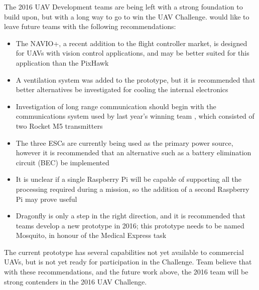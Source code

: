 The 2016 UAV Development teams are being left with a strong foundation to build upon, but with a long way to go to win the UAV Challenge. \ID would like to leave future teams with the following recommendations:

\begin{itemize}
	\item The NAVIO+\cite{ref:navio}, a recent addition to the flight controller market, is designed for UAVs with vision control applications, and may be better suited for this application than the PixHawk
	\item A ventilation system was added to the prototype, but it is recommended that better alternatives be investigated for cooling the internal electronics
	\item Investigation of long range communication should begin with the communications system used by last year's winning team \cite{ref:2014winners}, which consisted of two Rocket M5 transmitters \cite{ref:rocket}
	\item The three ESCs are currently being used as the primary power source, however it is recommended that an alternative such as a battery elimination circuit (BEC) be implemented
	\item It is unclear if a single Raspberry Pi will be capable of supporting all the processing required during a mission, so the addition of a second Raspberry Pi may prove useful
	\item Dragonfly is only a step in the right direction, and it is recommended that teams develop a new prototype in 2016; this prototype needs to be named Mosquito, in honour of the Medical Express task
\end{itemize}

The current prototype has several capabilities not yet available to commercial UAVs, but is not yet ready for participation in the Challenge. Team \ID believe that with these recommendations, and the future work above, the 2016 team will be strong contenders in the 2016 UAV Challenge.
